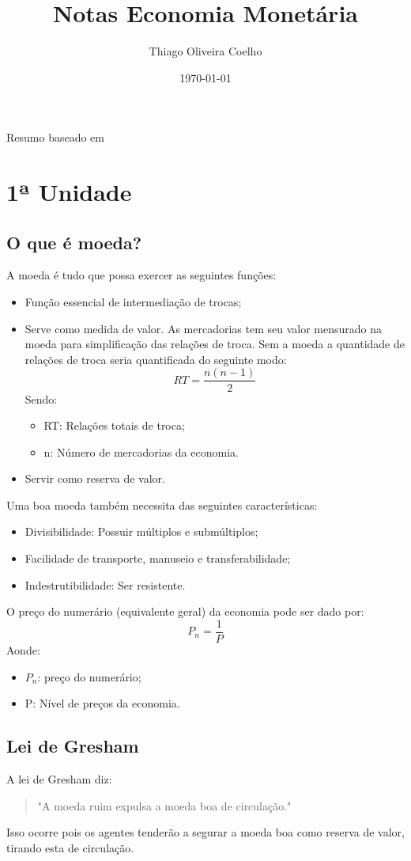 \documentclass[12pt,a4paper,oneside,brazil]{abntex2}
\title{Notas Economia Monetária}
\author{Thiago Oliveira Coelho}
\date{\today}
\begin{document}
\pagestyle{plain}
\maketitle
\begin{center}
Resumo baseado em \cite{rossetti98}
\end{center}
\tableofcontents
\chapter{1ª Unidade}

\section{O que é moeda?}
A moeda é tudo que possa exercer as seguintes funções:
\begin{itemize}
\item Função essencial de intermediação de trocas;
\item Serve como medida de valor. As mercadorias tem seu valor mensurado na moeda para simplificação das relações de troca. Sem a moeda a quantidade de relações de troca seria quantificada do seguinte modo: 
\[ RT = \frac{n (n-1)}{2}\]
Sendo:
\begin{itemize}
\item RT: Relações totais de troca;
\item n: Número de mercadorias da economia.
\end{itemize}
\item Servir como reserva de valor.
\end{itemize}
Uma boa moeda também necessita das seguintes características:
\begin{itemize}
\item Divisibilidade: Possuir múltiplos e submúltiplos;
\item Facilidade de transporte, manuseio e transferabilidade;
\item Indestrutibilidade: Ser resistente.
\end{itemize}

O preço do numerário (equivalente geral) da economia pode ser dado por:
\[P_n = \frac{1}{P}\] 
Aonde:
\begin{itemize}
\item $P_n$: preço do numerário;
\item P: Nível de preços da economia.
\end{itemize}

\section{Lei de Gresham}
A lei de Gresham diz: 
\begin{quote}
"A moeda ruim expulsa a moeda boa de circulação."
\end{quote}
Isso ocorre pois os agentes tenderão a segurar a moeda boa como reserva de valor, tirando esta de circulação.
\end{document}
